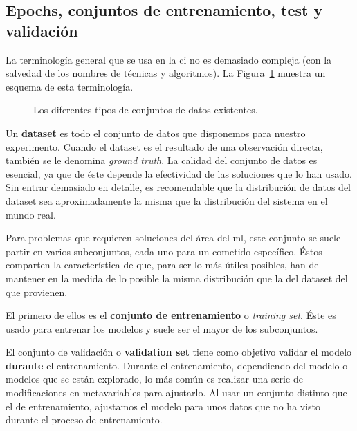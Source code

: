 \subsection{Epochs, conjuntos de entrenamiento, test y validación}

La terminología general que se usa en la \gls{ci} no es demasiado compleja (con la salvedad de los nombres de técnicas y algoritmos). La Figura~\ref{fig:different-kinds-of-datasets} muestra un esquema de esta terminología.

\begin{figure}
	\caption[Separación clásica de conjuntos de datos en tareas de \acrlong{ml}.]{Los diferentes tipos de conjuntos de datos existentes.}
	\label{fig:different-kinds-of-datasets}
\end{figure}

Un \textbf{dataset} es todo el conjunto de datos que disponemos para nuestro experimento. Cuando el dataset es el resultado de una observación directa, también se le denomina \textit{ground truth}. La calidad del conjunto de datos es esencial, ya que de éste depende la efectividad de las soluciones que lo han usado. Sin entrar demasiado en detalle, es recomendable que la distribución de datos del dataset sea aproximadamente la misma que la distribución del sistema en el mundo real.

Para problemas que requieren soluciones del área del \ac{ml}, este conjunto se suele partir en varios subconjuntos, cada uno para un cometido específico. Éstos comparten la característica de que, para ser lo más útiles posibles, han de mantener en la medida de lo posible la misma distribución que la del dataset del que provienen.

El primero de ellos es el \textbf{conjunto de entrenamiento} o \textit{training set}. Éste es usado para entrenar los modelos y suele ser el mayor de los subconjuntos.

El conjunto de validación o \textbf{validation set} tiene como objetivo validar el modelo \textbf{durante} el entrenamiento. Durante el entrenamiento, dependiendo del modelo o modelos que se están explorado, lo más común es realizar una serie de modificaciones en metavariables para ajustarlo. Al usar un conjunto distinto que el de entrenamiento, ajustamos el modelo para unos datos que no ha visto durante el proceso de entrenamiento.

